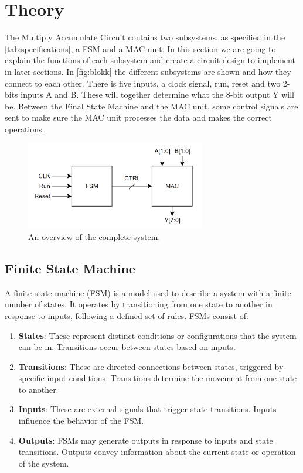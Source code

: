 \newpage
\section{Theory}
\label{sec:theory}

The Multiply Accumulate Circuit contains two subsystems, as specified in the \autoref{tab:specifications}, a FSM and a MAC unit. In this section we are going to explain the functions of each subsystem and create a circuit design to implement in later sections. In \autoref{fig:blokk} the different subsystems are shown and how they connect to each other. There is five inputs, a clock signal, run, reset and two 2-bits inputs A and B. These will together determine what the 8-bit output Y will be. Between the Final State Machine and the MAC unit, some control signals are sent to make sure the MAC unit processes the data and makes the correct operations. 

\begin{figure}[H]
    \centering
    \includegraphics[width=0.7\textwidth]{Figures/Blokk.png}
    \caption{An overview of the complete system.}
    \label{fig:blokk}
\end{figure}

\subsection{Finite State Machine}
\label{subsec:fsm_theory}

A finite state machine (FSM) is a model used to describe a system with a finite number of states. It operates by transitioning from one state to another in response to inputs, following a defined set of rules. FSMs consist of:

\begin{enumerate}
    \item \textbf{States}: These represent distinct conditions or configurations that the system can be in. Transitions occur between states based on inputs.
    
    \item \textbf{Transitions}: These are directed connections between states, triggered by specific input conditions. Transitions determine the movement from one state to another.
    
    \item \textbf{Inputs}: These are external signals that trigger state transitions. Inputs influence the behavior of the FSM.
    
    \item \textbf{Outputs}: FSMs may generate outputs in response to inputs and state transitions. Outputs convey information about the current state or operation of the system.
\end{enumerate}


